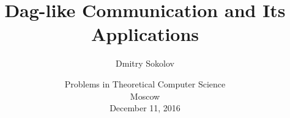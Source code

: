 

\title[Dag-like communication]{
	Dag-like Communication and Its Applications
}
  
\author[Sokolov D.]{Dmitry Sokolov}

\date{Problems in Theoretical Computer Science\\
	Moscow\\
	December 11, 2016
}



	\maketitle

	
    



